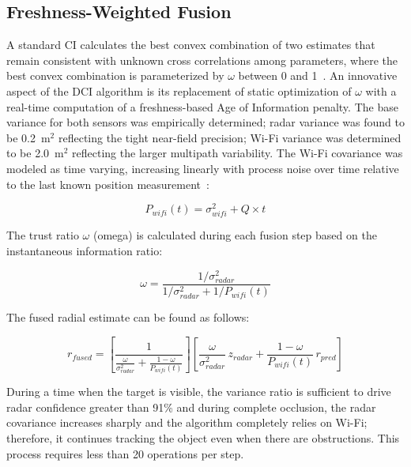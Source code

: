 \subsection{Freshness-Weighted Fusion}
\label{sec:freshness}

A standard CI calculates the best convex combination of two estimates that remain consistent with unknown cross correlations among parameters, where the best convex combination is parameterized by $\omega$ between 0 and 1~\cite{chen_ci,yang_heterogeneous}. An innovative aspect of the DCI algorithm is its replacement of static optimization of $\omega$ with a real-time computation of a freshness-based Age of Information penalty. The base variance for both sensors was empirically determined; radar variance was found to be 0.2~m$^2$ reflecting the tight near-field precision; Wi-Fi variance was determined to be 2.0~m$^2$ reflecting the larger multipath variability. The Wi-Fi covariance was modeled as time varying, increasing linearly with process noise over time relative to the last known position measurement~\cite{noroozi_aoi}:

\begin{equation}
P_{wifi}(t) = \sigma^2_{wifi} + Q \times t
\label{eq:wifi_cov}
\end{equation}

The trust ratio $\omega$ (omega) is calculated during each fusion step based on the instantaneous information ratio:

\begin{equation}
\omega = \frac{1/\sigma^2_{radar}}{1/\sigma^2_{radar} + 1/P_{wifi}(t)}
\label{eq:omega}
\end{equation}

The fused radial estimate can be found as follows:

\begin{equation}
r_{fused} = \left[\frac{1}{\frac{\omega}{\sigma^2_{radar}} + \frac{1-\omega}{P_{wifi}(t)}}\right] \left[\frac{\omega}{\sigma^2_{radar}}\, z_{radar} + \frac{1-\omega}{P_{wifi}(t)}\, r_{pred}\right]
\label{eq:fused}
\end{equation}

During a time when the target is visible, the variance ratio is sufficient to drive radar confidence greater than 91\% and during complete occlusion, the radar covariance increases sharply and the algorithm completely relies on Wi-Fi; therefore, it continues tracking the object even when there are obstructions. This process requires less than 20 operations per step.

